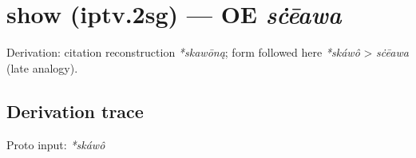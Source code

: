 \documentclass[
  british,
  a4paper,
  openany]{book}
\providecommand{\texorpdfstring}[2]{#1}
\begin{document}
\section{\texorpdfstring{show (iptv.2sg) --- OE
\emph{sċēawa}}{show (iptv.2sg) --- OE sċēawa}}\label{show-iptv.2sg-oe-sux10bux113awa}


Derivation: citation reconstruction \emph{*skawōną}; form followed here
\emph{*skáwô} \textgreater{} \emph{sċēawa} (late analogy).

\subsection{Derivation trace}\label{derivation-trace-134}

Proto input: \emph{*skáwô}

\begingroup
\setlength{\fboxsep}{6pt}
\end{document}
